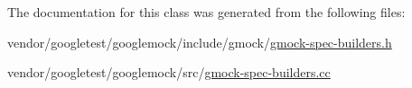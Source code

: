The documentation for this class was generated from the following files\+:\begin{DoxyCompactItemize}
\item 
vendor/googletest/googlemock/include/gmock/\hyperlink{gmock-spec-builders_8h}{gmock-\/spec-\/builders.\+h}\item 
vendor/googletest/googlemock/src/\hyperlink{gmock-spec-builders_8cc}{gmock-\/spec-\/builders.\+cc}\end{DoxyCompactItemize}
